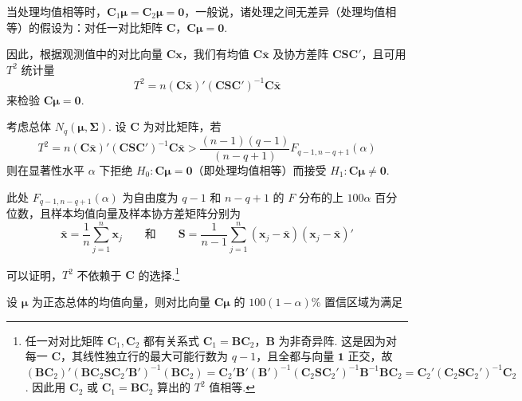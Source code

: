 当处理均值相等时，$\mathbf{C}_1\boldsymbol{\mu}=\mathbf{C}_2\boldsymbol{\mu}=\mathbf{0}$，一般说，诸处理之间无差异（处理均值相等）的假设为：对任一对比矩阵 $\mathbf{C}$，$\mathbf{C}\boldsymbol{\mu}=\mathbf{0}$.

因此，根据观测值中的对比向量 $\mathbf{C}\mathbf{x}$，我们有均值 $\mathbf{C}\bar{\mathbf{x}}$ 及协方差阵 $\mathbf{C}\mathbf{S}\mathbf{C}'$，且可用 $T^2$ 统计量
\[
T^2=n(\mathbf{C}\bar{\mathbf{x}})'(\mathbf{C}\mathbf{S}\mathbf{C}')^{-1}\mathbf{C}\bar{\mathbf{x}}
\]
来检验 $\mathbf{C}\boldsymbol{\mu}=\mathbf{0}$.

\begin{mvframe}[重复测量设计中各种处理的等效性检验]
考虑总体 $N_q(\boldsymbol{\mu},\boldsymbol{\Sigma})$. 设 $\mathbf{C}$ 为对比矩阵，若
\label{eq:6-16}
\begin{equation}
T^2=n(\mathbf{C}\bar{\mathbf{x}})'(\mathbf{C}\mathbf{S}\mathbf{C}')^{-1}\mathbf{C}\bar{\mathbf{x}}>\frac{(n-1)(q-1)}{(n-q+1)}F_{q-1,n-q+1}(\alpha) \tag{6-16}
\end{equation}
则在显著性水平 $\alpha$ 下拒绝 $H_0: \mathbf{C}\boldsymbol{\mu}=\mathbf{0}$（即处理均值相等）而接受 $H_1: \mathbf{C}\boldsymbol{\mu}\neq\mathbf{0}$.

此处 $F_{q-1,n-q+1}(\alpha)$ 为自由度为 $q-1$ 和 $n-q+1$ 的 $F$ 分布的上 $100\alpha$ 百分位数，且样本均值向量及样本协方差矩阵分别为
\[
\bar{\mathbf{x}}=\frac{1}{n}\sum_{j=1}^n\mathbf{x}_j\qquad 和\qquad \mathbf{S}=\frac{1}{n-1}\sum_{j=1}^n(\mathbf{x}_j-\bar{\mathbf{x}})(\mathbf{x}_j-\bar{\mathbf{x}})'
\]
\end{mvframe}

可以证明，$T^2$ 不依赖于 $\mathbf{C}$ 的选择.\footnote{任一对对比矩阵 $\mathbf{C}_1,\mathbf{C}_2$ 都有关系式 $\mathbf{C}_1=\mathbf{B}\mathbf{C}_2$，$\mathbf{B}$ 为非奇异阵. 这是因为对每一 $\mathbf{C}$，其线性独立行的最大可能行数为 $q-1$，且全都与向量 $\mathbf{1}$ 正交，故 $(\mathbf{B}\mathbf{C}_2)'(\mathbf{B}\mathbf{C}_2\mathbf{S}\mathbf{C}_2'\mathbf{B}')^{-1}(\mathbf{B}\mathbf{C}_2)=\mathbf{C}_2'\mathbf{B}'(\mathbf{B}')^{-1}(\mathbf{C}_2\mathbf{S}\mathbf{C}_2')^{-1}\mathbf{B}^{-1}\mathbf{B}\mathbf{C}_2=\mathbf{C}_2'(\mathbf{C}_2\mathbf{S}\mathbf{C}_2')^{-1}\mathbf{C}_2$. 因此用 $\mathbf{C}_2$ 或 $\mathbf{C}_1=\mathbf{B}\mathbf{C}_2$ 算出的 $T^2$ 值相等.}

设 $\boldsymbol{\mu}$ 为正态总体的均值向量，则对比向量 $\mathbf{C}\boldsymbol{\mu}$ 的 $100(1-\alpha)\%$ 置信区域为满足
